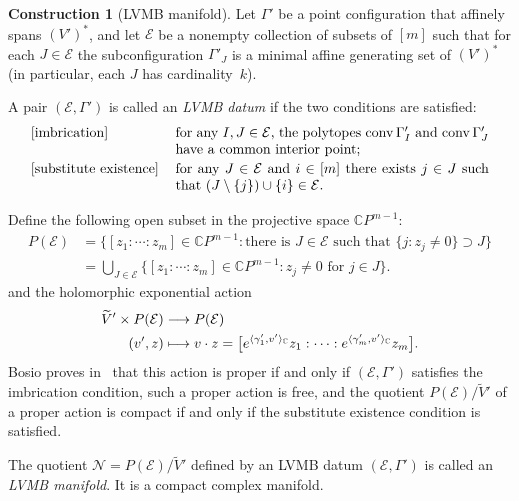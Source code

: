 \documentclass[a4paper]{amsart}
\theoremstyle{definition}
\newtheorem{construction}[theorem]{Construction}
\theoremstyle{remark}
\numberwithin{equation}{section}
\def\C{\mathbb C}
\newcommand{\mb}[1]{{\textbf {\textit#1}}}
\def\conv{\mathop{\mathrm{conv}}}
\newcommand{\<}{\langle}
\renewcommand{\>}{\rangle}
\begin{document}
\begin{construction}[LVMB manifold]
Let $\Gamma'$ be a point configuration that affinely spans $(V')^*$, and
let $\mathcal E$ be a nonempty collection of subsets of $[m]$ such that for each $J\in\mathcal E$ the subconfiguration $\Gamma'_J$ is a minimal affine generating set of $(V')^*$ (in particular, each $J$ has cardinality~$k$).

A pair $(\mathcal E,\Gamma')$ is called an \emph{LVMB datum} if the two conditions are satisfied:
\[
\begin{tabular}{l p{0.65\textwidth}}
[\emph{imbrication}]& for any $I,J\in\mathcal E$, the polytopes 
$\conv\Gamma'_I$ and $\conv\Gamma'_J$ have a common interior point;\\[2pt]

[\emph{substitute existence}]& for any $J\in\mathcal E$ and $i\in[m]$ there exists $j\in J$ such that $(J\setminus\{j\})\cup\{i\}\in\mathcal E$.
\end{tabular}
\]

Define the following open subset in the projective space $\C P^{m-1}$:
\[
\begin{aligned}
  P(\mathcal E)&=\bigl\{[z_1:\cdots: z_m]\in\C P^{m-1}\colon
  \text{there is $J\in\mathcal E$ such that }
  \{j\colon z_j\ne0\}\supset J\bigr\}\\
  &=\bigcup_{J\in\mathcal E}\bigl\{[z_1:\cdots: z_m]\in\C P^{m-1}\colon
   z_j\ne0\text{ for }j\in J\bigr\}.
\end{aligned}
\]
and the holomorphic exponential action
\begin{equation}\label{bact}
\begin{aligned}
  \widetilde V'\times P(\mathcal E)&\longrightarrow P(\mathcal E)\\
  (\mb v',\mb z)&\longmapsto \mb v\cdot\mb z=\bigl[e^{\langle\gamma'_1,\mb
  v'\rangle_\C}z_1:\cdots:e^{\langle\gamma'_m,\mb v'\rangle_\C}z_m\bigr].
\end{aligned}
\end{equation}
Bosio proves in~\cite[Theorem~1.4]{bosi01} that this action is proper if and only if 
$(\mathcal E,\Gamma')$ satisfies the imbrication condition, such a proper action is free, 
and the quotient $P(\mathcal E)/\widetilde V'$ of a proper action is compact if and only if the substitute existence condition is satisfied. 

The quotient  $\mathcal N=P(\mathcal E)/\widetilde V'$ defined by an LVMB datum 
$(\mathcal E,\Gamma')$ is called an \emph{LVMB manifold}. It is a compact complex manifold.
\end{construction}
\end{document}
